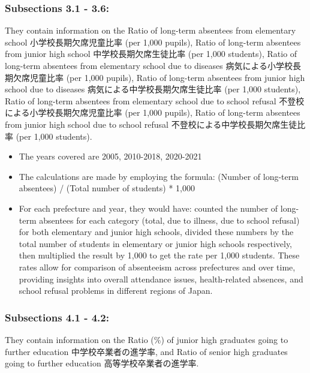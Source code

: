 \documentclass[
]{ltjarticle}
\begin{document}
\hypertarget{subsections-3.1---3.6}{%
\subsubsection{Subsections 3.1 - 3.6:}\label{subsections-3.1---3.6}}

They contain information on the Ratio of long-term absentees from
elementary school 小学校長期欠席児童比率 (per 1,000 pupils), Ratio of
long-term absentees from junior high school 中学校長期欠席生徒比率 (per
1,000 students), Ratio of long-term absentees from elementary school due
to diseases 病気による小学校長期欠席児童比率 (per 1,000 pupils), Ratio
of long-term absentees from junior high school due to diseases
病気による中学校長期欠席生徒比率 (per 1,000 students), Ratio of
long-term absentees from elementary school due to school refusal
不登校による小学校長期欠席児童比率 (per 1,000 pupils), Ratio of
long-term absentees from junior high school due to school refusal
不登校による中学校長期欠席生徒比率 (per 1,000 students).

\begin{itemize}
\item
  The years covered are 2005, 2010-2018, 2020-2021
\item
  The calculations are made by employing the formula: (Number of
  long-term absentees) / (Total number of students) * 1,000
\item
  For each prefecture and year, they would have: counted the number of
  long-term absentees for each category (total, due to illness, due to
  school refusal) for both elementary and junior high schools, divided
  these numbers by the total number of students in elementary or junior
  high schools respectively, then multiplied the result by 1,000 to get
  the rate per 1,000 students. These rates allow for comparison of
  absenteeism across prefectures and over time, providing insights into
  overall attendance issues, health-related absences, and school refusal
  problems in different regions of Japan.
\end{itemize}

\hypertarget{subsections-4.1---4.2}{%
\subsubsection{Subsections 4.1 - 4.2:}\label{subsections-4.1---4.2}}

They contain information on the Ratio (\%) of junior high graduates
going to further education 中学校卒業者の進学率, and Ratio of senior
high graduates going to further education 高等学校卒業者の進学率.
\end{document}

